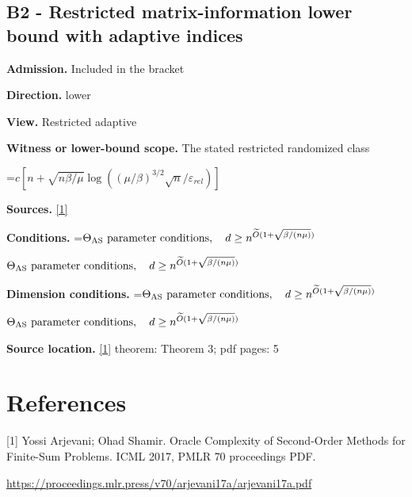 \documentclass[10pt,a4paper]{article}
\newcommand{\AtlasMath}[1]{\par\begingroup\centering\setbox0=\hbox{$\displaystyle #1$}\ifdim\wd0>1.4\linewidth\typeout{ATLAS WIDE FORMULA: \the\wd0}\fi\ifdim\wd0>\linewidth\resizebox{\linewidth}{!}{\box0}\else\box0\fi\par\endgroup}
\newcommand{\AtlasInlineMath}[1]{\begingroup\setbox0=\hbox{$#1$}\ifdim\wd0>.4\linewidth\endgroup\AtlasMath{#1}\else\endgroup$#1$\fi}
\begin{document}
\subsection{B2 - Restricted matrix-information lower bound with adaptive indices}
\textbf{Admission.} Included in the bracket

\textbf{Direction.} lower

\textbf{View.} Restricted adaptive

\textbf{Witness or lower-bound scope.} The stated restricted randomized class

\AtlasMath{c[n+\sqrt{n\beta/\mu}\log((\mu/\beta)^{3/2}\sqrt n/\varepsilon_{rel})]}
\textbf{Sources.} \href{https://proceedings.mlr.press/v70/arjevani17a/arjevani17a.pdf}{[1]}

\textbf{Conditions.} \AtlasInlineMath{\Theta_{\rm AS}\text{ parameter conditions},\quad d\ge n^{\widetilde{O}(1+\sqrt{\beta/(n\mu)})}}

\textbf{Dimension conditions.} \AtlasInlineMath{\Theta_{\rm AS}\text{ parameter conditions},\quad d\ge n^{\widetilde{O}(1+\sqrt{\beta/(n\mu)})}}

\textbf{Source location.} \href{https://proceedings.mlr.press/v70/arjevani17a/arjevani17a.pdf}{[1]} theorem: Theorem 3; pdf pages: 5

\section{References}
[1] Yossi Arjevani; Ohad Shamir. Oracle Complexity of Second-Order Methods for Finite-Sum Problems. ICML 2017, PMLR 70 proceedings PDF.

\url{https://proceedings.mlr.press/v70/arjevani17a/arjevani17a.pdf}
\end{document}
